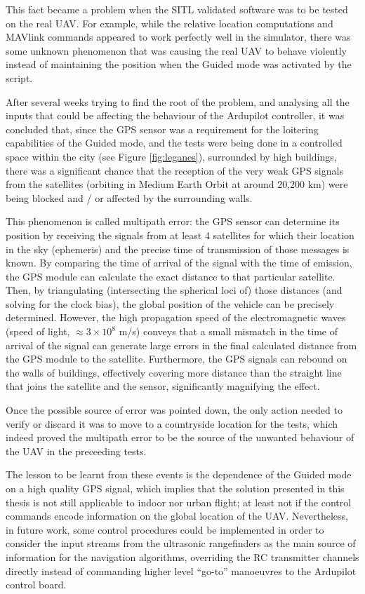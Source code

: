 This fact became a problem when the SITL validated software was to be tested on the real UAV.
For example, while the relative location computations and MAVlink commands appeared to work perfectly well in the simulator, there was some unknown phenomenon that was causing the real UAV to behave violently instead of maintaining the position when the Guided mode was activated by the script.

After several weeks trying to find the root of the problem, and analysing all the inputs that could be affecting the behaviour of the Ardupilot controller, it was concluded that, since the GPS sensor was a requirement for the loitering capabilities of the Guided mode, and the tests were being done in a controlled space within the city (see Figure \ref{fig:leganes}), surrounded by high buildings, there was a significant chance that the reception of the very weak GPS signals from the satellites (orbiting in Medium Earth Orbit at around 20,200 km) were being blocked and / or affected by the surrounding walls.



This phenomenon is called multipath error: the GPS sensor can determine its position by receiving the signals from at least 4 satellites for which their location in the sky (ephemeris) and the precise time of transmission of those messages is known.
By comparing the time of arrival of the signal with the time of emission, the GPS module can calculate the exact distance to that particular satellite.
Then, by triangulating (intersecting the spherical loci of) those distances (and solving for the clock bias), the global position of the vehicle can be precisely determined.
However, the high propagation speed of the electromagnetic waves (speed of light, $\approx 3\times 10^8$ m/s) conveys that a small mismatch in the time of arrival of the signal can generate large errors in the final calculated distance from the GPS module to the satellite.
Furthermore, the GPS signals can rebound on the walls of buildings, effectively covering more distance than the straight line that joins the satellite and the sensor, significantly magnifying the effect.

Once the possible source of error was pointed down, the only action needed to verify or discard it was to move to a countryside location for the tests, which indeed proved the multipath error to be the source of the unwanted behaviour of the UAV in the preceeding tests.

The lesson to be learnt from these events is the dependence of the Guided mode on a high quality GPS signal, which implies that the solution presented in this thesis is not still applicable to indoor nor urban flight; at least not if the control commands encode information on the global location of the UAV.
Nevertheless, in future work, some control procedures could be implemented in order to consider the input streams from the ultrasonic rangefinders as the main source of information for the navigation algorithms, overriding the RC transmitter channels directly instead of commanding higher level ``go-to'' manoeuvres to the Ardupilot control board.

